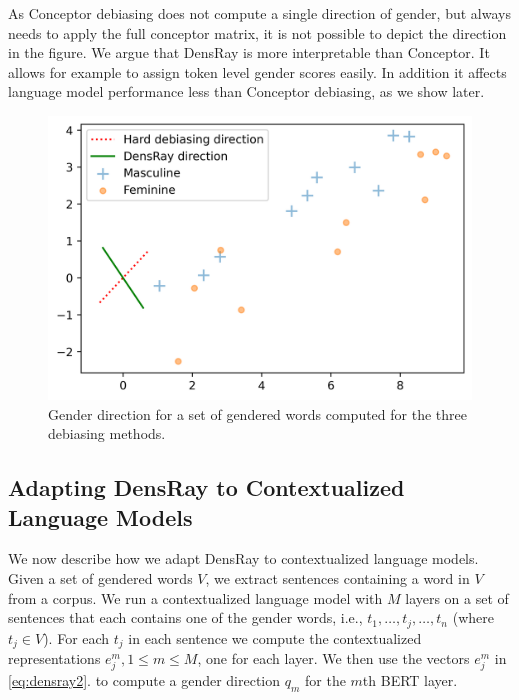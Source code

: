 As Conceptor debiasing does not compute a single direction of gender, but always needs to apply the full conceptor matrix, it is not possible to depict the direction in the figure. 
We argue that DensRay is more interpretable than Conceptor. It allows for example to assign token level gender scores easily. In addition it affects language model performance less than Conceptor debiasing, as we show later.
\begin{figure}[h]
	\centering
	\includegraphics[width=0.4\linewidth]{examples.png}
	\caption{Gender direction for a set of gendered
          words computed for the three debiasing methods.}
\end{figure}

\subsection{Adapting DensRay to Contextualized Language Models}
We now describe how we adapt DensRay to contextualized
language models. Given a set of gendered words
$V$, we extract sentences containing a word in $V$ from a
corpus. We run a contextualized language model
with $M$ layers
on a set of 
sentences that each contains one of the gender words, i.e., 
$t_1,\ldots,t_j,\ldots,t_n$ (where $t_j \in V$). 
For each $t_j $ in each sentence we  compute the contextualized representations $e_j^m, 1\leq m
\leq M$, one for each layer. We then use the vectors $e_j^m$ in \eqref{eq:densray2}.
to compute a gender direction
$q_m$ for the $m$th BERT layer. 
